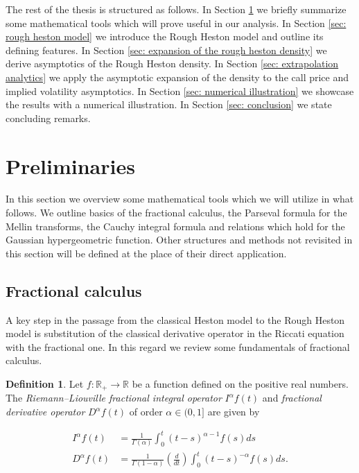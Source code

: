 \documentclass[12pt,twoside]{article}
\theoremstyle{plain}
\theoremstyle{plain}
\theoremstyle{definition}
\newtheorem{definition}[proposition]{Definition}
\theoremstyle{remark}
\numberwithin{equation}{section}
\begin{document}
The rest of the thesis is structured as follows. In Section \ref{sec: preliminaries} we briefly summarize some mathematical tools which will prove useful in our analysis. In Section \ref{sec: rough heston model} we introduce the Rough Heston model and outline its defining features. In Section \ref{sec: expansion of the rough heston density} we derive asymptotics of the Rough Heston density. In Section \ref{sec: extrapolation analytics} we apply the asymptotic expansion of the density to the call price and implied volatility asymptotics. In Section \ref{sec: numerical illustration} we showcase the results with a numerical illustration. In Section \ref{sec: conclusion} we state concluding remarks.

\section{Preliminaries}
\label{sec: preliminaries}

In this section we overview some mathematical tools which we will utilize in what follows. We outline basics of the fractional calculus, the Parseval formula for the Mellin transforms, the Cauchy integral formula and relations which hold for the Gaussian hypergeometric function. Other structures and methods not revisited in this section will be defined at the place of their direct application.

\subsection{Fractional calculus}

A key step in the passage from the classical Heston model to the Rough Heston model is substitution of the classical derivative operator in the Riccati equation with the fractional one. In this regard we review some fundamentals of fractional calculus.

\begin{definition}

Let $f: \mathbb R_+\rightarrow \mathbb R$ be a function defined on the positive real numbers. The \emph{Riemann–Liouville fractional integral operator} $I^\alpha f(t)$ and \emph{fractional derivative operator} $D^\alpha f(t)$ of order $\alpha\in(0, 1]$ are given by

$$
\begin{aligned}
I^{\alpha} f(t)&=\frac{1}{\Gamma(\alpha)} \int_{0}^{t}(t-s)^{\alpha-1} f(s) ds \\[10pt]
D^{\alpha} f(t)&=\frac{1}{\Gamma(1-\alpha)}\left( \frac{d}{d t} \right) \int_{0}^{t}(t-s)^{-\alpha} f(s) d s.
\end{aligned}
$$

\end{definition}
\end{document}

